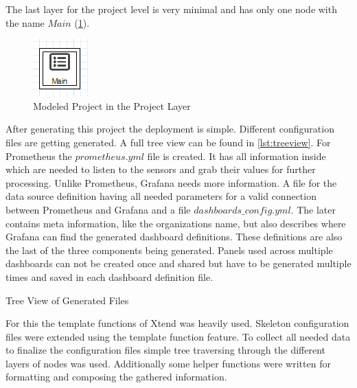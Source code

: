 The last layer for the project level is very minimal and has only one node with the name $Main$ (\cref{fig:modeled_project_layer}).

\begin{figure}[!ht]
	\centering
	\includegraphics{assets/images/projectLayer}
	\caption{Modeled Project in the Project Layer}
	\label{fig:modeled_project_layer}
\end{figure}

After generating this project the  deployment is simple. Different configuration files are getting generated. A full tree view can be found in \cref{lst:treeview}. For Prometheus the $prometheus.yml$ file is created. It has all information inside which are needed to listen to the sensors and grab their values for further processing. Unlike Prometheus, Grafana needs more information. A file for the data source definition having all needed parameters for a valid connection between Prometheus and Grafana and a file $dashboards\_config.yml$. The later contains meta information, like the organizations name, but also describes where Grafana can find the generated dashboard definitions. These definitions are also the last of the three components being generated. Panels used across multiple dashboards can not be created once and shared but have to be generated multiple times and saved in each dashboard definition file.

\begin{listing}[!ht]
	\setlength{\DTbaselineskip}{20pt}
	\caption{Tree View of Generated Files}
	\label{lst:treeview}
\end{listing}

For this the template functions of Xtend was heavily used. Skeleton configuration files were extended using the template function feature. To collect all needed data to finalize the configuration files simple tree traversing through the different layers of nodes was used. Additionally some helper functions were written for formatting and composing the gathered information. 

